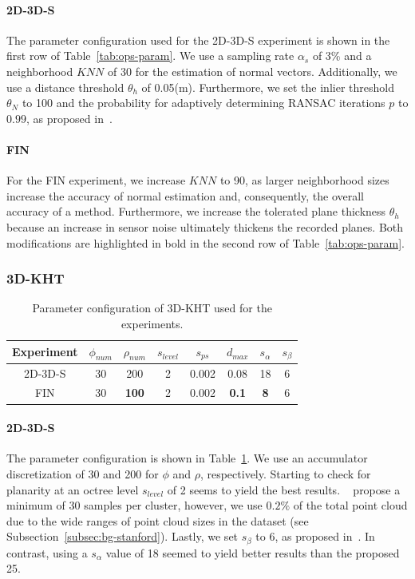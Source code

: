 \documentclass[main.tex]{subfiles}
\begin{document}
\paragraph{2D-3D-S}
The parameter configuration used for the 2D-3D-S experiment is shown in the first row of Table~\ref{tab:ops-param}.
We use a sampling rate $\alpha_s$ of 3\% and a neighborhood $KNN$ of 30 for the estimation of normal vectors.
Additionally, we use a distance threshold $\theta_h$ of 0.05(m).
Furthermore, we set the inlier threshold $\theta_N$ to 100 and the probability for adaptively determining RANSAC iterations
$p$ to $0.99$, as proposed in~\cite[Section~4A]{Sun_Mordohai_2019}.

\paragraph{FIN}
For the FIN experiment, we increase $KNN$ to 90, as larger neighborhood sizes increase the accuracy of normal estimation and,
consequently, the overall accuracy of a method.
Furthermore, we increase the tolerated plane thickness $\theta_h$ because an increase in sensor noise ultimately thickens the recorded planes.
Both modifications are highlighted in bold in the second row of Table~\ref{tab:ops-param}.

\subsubsection{3D-KHT}
\begin{table}[H]
    \centering
    \begin{tabular}{c|ccccccc}
        Experiment & $\phi_{num}$ & $\rho_{num}$ & $s_{level}$ & $s_{ps}$ & $d_{max}$    & $s_\alpha$ & $s_\beta$ \\ \hline
        2D-3D-S    & 30           & 200          & 2           & 0.002    & 0.08         & 18         & 6         \\
        FIN        & 30           & \textbf{100} & 2           & 0.002    & \textbf{0.1} & \textbf{8} & 6
    \end{tabular}%
    \caption{Parameter configuration of 3D-KHT used for the experiments.}
    \label{tab:3dkht-param}
\end{table}

\paragraph{2D-3D-S}
The parameter configuration is shown in Table~\ref{tab:3dkht-param}. We use an accumulator discretization of 30 and 200 for $\phi$ and $\rho$, respectively.
Starting to check for planarity at an octree level $s_{level}$ of 2 seems to yield the best results.
\citeauthor{Limberger_Oliveira_2015}~\cite{Limberger_Oliveira_2015} propose
a minimum of 30 samples per cluster, however, we use $0.2\%$ of the total point cloud due to the wide ranges of point cloud sizes in the dataset (see Subsection~\ref{subsec:bg-stanford}).
Lastly, we set $s_\beta$ to 6, as proposed in~\cite[Section~3.1]{Limberger_Oliveira_2015}. In contrast, using a $s_\alpha$ value of 18 seemed to yield better results than the proposed 25.
\end{document}
